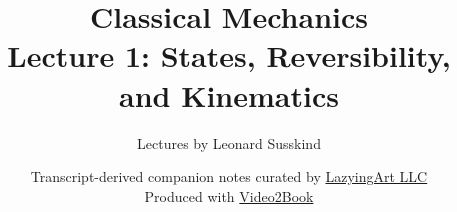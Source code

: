 \documentclass[11pt,oneside]{book}
\begin{document}
\hypersetup{pageanchor=false}
\frontmatter
\title{Classical Mechanics\\[0.45em]
\large Lecture 1: States, Reversibility, and Kinematics}
\author{Lectures by Leonard Susskind}
\date{Transcript-derived companion notes curated by
\href{https://lazying.art}{LazyingArt LLC}\\[0.35em]
\small Produced with
\href{https://github.com/lachlanchen/Video2Book}{Video2Book}}
\maketitle
\hypersetup{pageanchor=true}
\mainmatter

\end{document}
